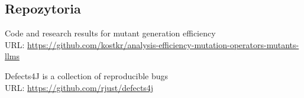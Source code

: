 \documentclass[12pt,a4paper,oldfontcommands]{memoir}
\theoremstyle{plain}
\theoremstyle{definition}
\theoremstyle{remark}
\begin{document}
    \newpage
    \begin{appendices}

        \clearpage
        \openany
        \chapter{Repozytoria}
        \openright

        Code and research results for mutant generation efficiency \\
        URL: \url{https://github.com/kostkr/analysis-efficiency-mutation-operators-mutants-llms}

        Defects4J is a collection of reproducible bugs \\
        URL: \url{https://github.com/rjust/defects4j}
    \end{appendices}
\end{document}
